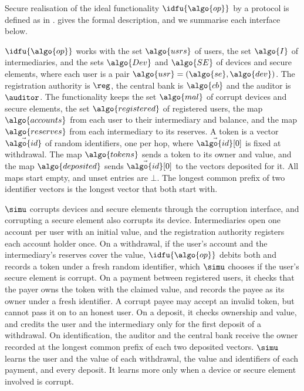 Secure realisation of the ideal functionality $\idfu{\algo{op}}$ by a protocol
is defined as in .  gives the
formal description, and we summarise each interface below.

$\idfu{\algo{op}}$ works with the set $\algo{usrs}$ of users, the set $\algo{I}$
of intermediaries, and the sets $\algo{Dev}$ and $\algo{SE}$ of devices and
secure elements, where each user is a pair $\algo{usr} = (\algo{se},
\algo{dev})$. The registration authority is $\reg$, the central bank is
$\algo{cb}$ and the auditor is $\auditor$. The functionality keeps the set
$\algo{mal}$ of corrupt devices and secure elements, the set
$\algo{registered}$ of registered users, the map $\algo{accounts}$ from each
user to their intermediary and balance, and the map $\algo{reserves}$ from each
intermediary to its reserves. A token is a vector $\vec{\algo{id}}$ of random
identifiers, one per hop, where $\vec{\algo{id}}[0]$ is fixed at withdrawal.
The map $\algo{tokens}$ sends a token to its owner and value, and the map
$\algo{deposited}$ sends $\vec{\algo{id}}[0]$ to the vectors deposited for it.
All maps start empty, and unset entries are $\bot$. The longest common prefix
of two identifier vectors is the longest vector that both start with.

$\simu$ corrupts devices and secure elements through the corruption interface,
and corrupting a secure element also corrupts its device. Intermediaries open
one account per user with an initial value, and the registration authority
registers each account holder once. On a withdrawal, if the user's account and
the intermediary's reserves cover the value, $\idfu{\algo{op}}$ debits both and
records a token under a fresh random identifier, which $\simu$ chooses if the
user's secure element is corrupt. On a payment between registered users, it
checks that the payer owns the token with the claimed value, and records the
payee as its owner under a fresh identifier. A corrupt payee may accept an
invalid token, but cannot pass it on to an honest user. On a deposit, it checks
ownership and value, and credits the user and the intermediary only for the
first deposit of a withdrawal. On identification, the auditor and the central
bank receive the owner recorded at the longest common prefix of each two
deposited vectors. $\simu$ learns the user and the value of each withdrawal,
the value and identifiers of each payment, and every deposit. It learns more
only when a device or secure element involved is corrupt.

